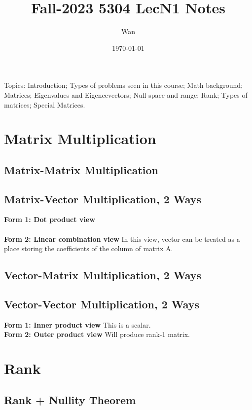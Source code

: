 \documentclass{article}
\begin{document}
\title{Fall-2023 5304 LecN1 Notes}
\author{Wan}
\date{\today}
\maketitle

\noindent
Topics: Introduction; Types of problems seen in this course; Math background;
Matrices; Eigenvalues and Eigencevectors; Null space and range; Rank; Types of matrices;
Special Matrices.

\section{Matrix Multiplication}

\subsection*{Matrix-Matrix Multiplication}


\subsection*{Matrix-Vector Multiplication, 2 Ways}
\textbf{Form 1: Dot product view}\\
\\
\textbf{Form 2: Linear combination view}
In this view, vector can be treated as a place storing the coefficients
of the column of matrix A.


\subsection*{Vector-Matrix Multiplication, 2 Ways}

\subsection*{Vector-Vector Multiplication, 2 Ways}
\textbf{Form 1: Inner product view}
This is a scalar.
\\
\textbf{Form 2: Outer product view}
Will produce rank-1 matrix.




\section{Rank}

\subsection*{Rank + Nullity Theorem}
\end{document}
